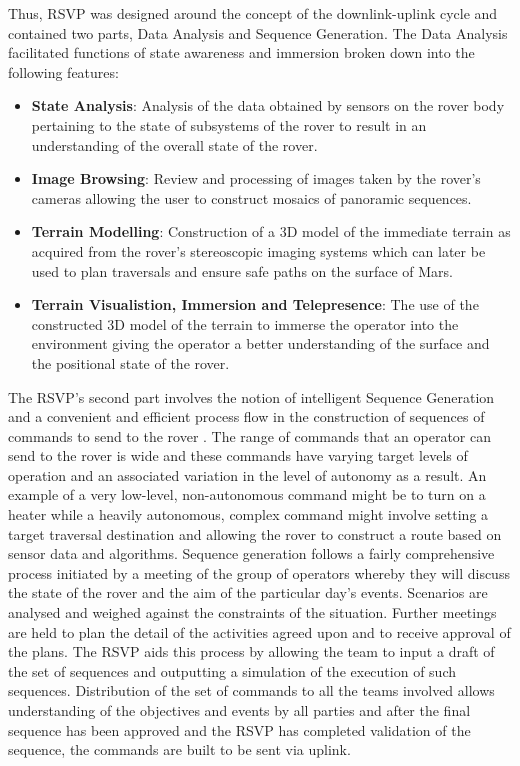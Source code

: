       Thus, RSVP was designed around the concept of the downlink-uplink cycle and contained two parts, Data Analysis and Sequence Generation. The Data Analysis facilitated functions of state awareness and immersion broken down into the following features:
      \begin{itemize}
        \item \textbf{State Analysis}: Analysis of the data obtained by sensors on the rover body pertaining to the state of subsystems of the rover to result in an understanding of the overall state of the rover.
        \item \textbf{Image Browsing}: Review and processing of images taken by the rover's cameras allowing the user to construct mosaics of panoramic sequences.
        \item \textbf{Terrain Modelling}: Construction of a 3D model of the immediate terrain as acquired from the rover's stereoscopic imaging systems which can later be used to plan traversals and ensure safe paths on the surface of Mars.
        \item \textbf{Terrain Visualistion, Immersion and Telepresence}: The use of the constructed 3D model of the terrain to immerse the operator into the environment giving the operator a better understanding of the surface and the positional state of the rover.
      \end{itemize}
      
      The RSVP's second part involves the notion of intelligent Sequence Generation and a convenient and efficient process flow in the construction of sequences of commands to send to the rover \cite{1_wright_hartman_cooper_maxwell_yen_morrison_2006}. The range of commands that an operator can send to the rover is wide and these commands have varying target levels of operation and an associated variation in the level of autonomy as a result. An example of a very low-level, non-autonomous command might be to turn on a heater while a heavily autonomous, complex command might involve setting a target traversal destination and allowing the rover to construct a route based on sensor data and algorithms. Sequence generation follows a fairly comprehensive process initiated by a meeting of the group of operators whereby they will discuss the state of the rover and the aim of the particular day's events. Scenarios are analysed and weighed against the constraints of the situation. Further meetings are held to plan the detail of the activities agreed upon and to receive approval of the plans. The RSVP aids this process by allowing the team to input a draft of the set of sequences and outputting a simulation of the execution of such sequences. Distribution of the set of commands to all the teams involved allows understanding of the objectives and events by all parties and after the final sequence has been approved and the RSVP has completed validation of the sequence, the commands are built to be sent via uplink.
      
